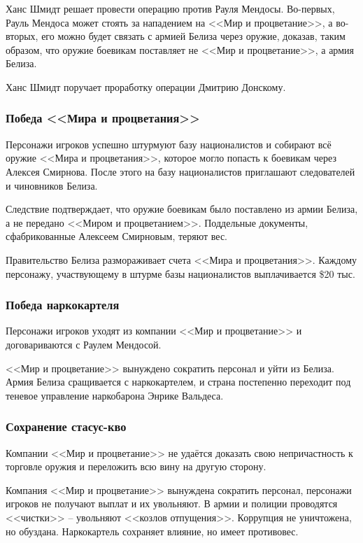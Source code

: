 \documentclass{article}
\begin{document}
Ханс Шмидт решает провести операцию против Рауля Мендосы. Во-первых,
Рауль Мендоса может стоять за нападением на <<Мир и процветание>>, а
во-вторых, его можно будет связать с армией Белиза через оружие,
доказав, таким образом, что оружие боевикам поставляет не <<Мир и
процветание>>, а армия Белиза.

Ханс Шмидт поручает проработку операции Дмитрию Донскому.

\subsubsection{Победа <<Мира и
процветания>>}\label{pap-victory}

Персонажи игроков успешно штурмуют базу националистов и собирают всё
оружие <<Мира и процветания>>, которое могло попасть к боевикам через
Алексея Смирнова. После этого на базу националистов приглашают
следователей и чиновников Белиза.

Следствие подтверждает, что оружие боевикам было поставлено из армии
Белиза, а не передано <<Миром и процветанием>>. Поддельные документы,
сфабрикованные Алексеем Смирновым, теряют вес.

Правительство Белиза размораживает счета <<Мира и процветания>>. Каждому
персонажу, участвующему в штурме базы националистов выплачивается \$20
тыс.

\subsubsection{Победа
наркокартеля}\label{cartel-victory}

Персонажи игроков уходят из компании <<Мир и процветание>> и
договариваются с Раулем Мендосой.

<<Мир и процветание>> вынуждено сократить персонал и уйти из Белиза. Армия
Белиза сращивается с наркокартелем, и страна постепенно переходит под
теневое управление наркобарона Энрике Вальдеса.

\subsubsection{Сохранение
стасус-кво}\label{status-quo}

Компании <<Мир и процветание>> не удаётся доказать свою непричастность к
торговле оружия и переложить всю вину на другую сторону.

Компания <<Мир и процветание>> вынуждена сократить персонал, персонажи
игроков не получают выплат и их увольняют. В армии и полиции проводятся
<<чистки>> -- увольняют <<козлов отпущения>>. Коррупция не уничтожена, но
обуздана. Наркокартель сохраняет влияние, но имеет противовес.
\end{document}
